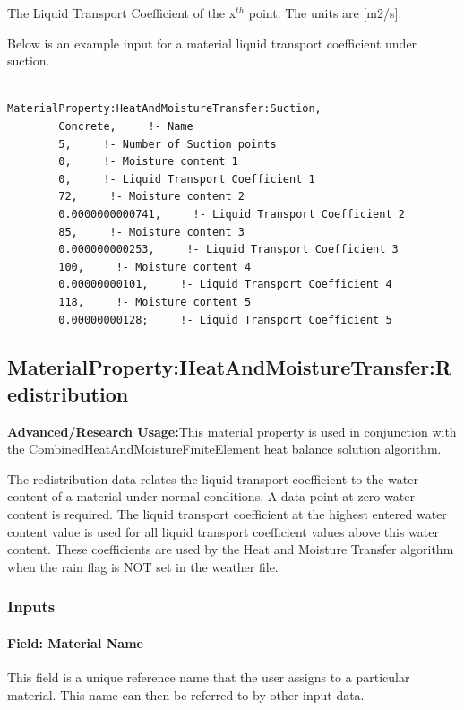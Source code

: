 The Liquid Transport Coefficient of the x\(^{th}\) point. The units are {[}m2/s{]}.

Below is an example input for a material liquid transport coefficient under suction.

\begin{lstlisting}

MaterialProperty:HeatAndMoistureTransfer:Suction,
        Concrete,     !- Name
        5,     !- Number of Suction points
        0,     !- Moisture content 1
        0,     !- Liquid Transport Coefficient 1
        72,     !- Moisture content 2
        0.0000000000741,     !- Liquid Transport Coefficient 2
        85,     !- Moisture content 3
        0.000000000253,     !- Liquid Transport Coefficient 3
        100,     !- Moisture content 4
        0.00000000101,     !- Liquid Transport Coefficient 4
        118,     !- Moisture content 5
        0.00000000128;     !- Liquid Transport Coefficient 5
\end{lstlisting}

\subsection{MaterialProperty:HeatAndMoistureTransfer:Redistribution}\label{materialpropertyheatandmoisturetransferredistribution}

\textbf{Advanced/Research Usage:}This material property is used in conjunction with the CombinedHeatAndMoistureFiniteElement heat balance solution algorithm.

The redistribution data relates the liquid transport coefficient to the water content of a material under normal conditions. A data point at zero water content is required. The liquid transport coefficient at the highest entered water content value is used for all liquid transport coefficient values above this water content. These coefficients are used by the Heat and Moisture Transfer algorithm when the rain flag is NOT set in the weather file.

\subsubsection{Inputs}\label{inputs-10-020}

\paragraph{Field: Material Name}\label{field-material-name-3}

This field is a unique reference name that the user assigns to a particular material. This name can then be referred to by other input data.


